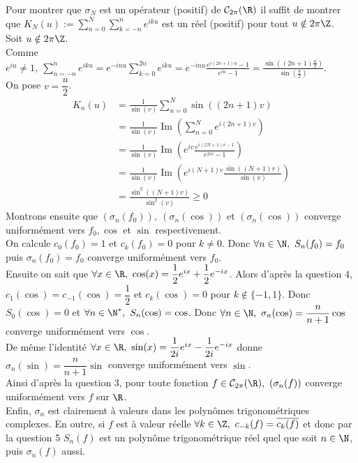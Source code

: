 \documentclass{book}
\begin{document}
\begin{enumerate}[leftmargin=*]
		Pour montrer que $\sigma_N$ est un opérateur (positif) de $\mathcal C_{2\pi}(\R)$ il suffit de montrer que $K_N(u):=\displaystyle\sum_{n=0}^N\sum_{k=-n}^ne^{iku}$ est un réel (positif) pour tout $u\notin 2\pi\Z$.\\
		Soit $u\notin 2\pi\Z$.\\
		Comme $e^{iu}\ne 1,\ \displaystyle\sum_{n=-n}^ne^{iku}=e^{-inu}\sum_{k=0}^{2n}e^{iku}=e^{-inu}\frac{e^{i(2n+1)u}-1}{e^{iu}-1}=\frac{\sin\left((2n+1)\frac{u}{2}\right)}{\sin\left(\frac{u}{2}\right)}$.\\
		On pose $v=\dfrac{u}{2}$.\\
		\begin{align*}
			K_n(u)&=\frac{1}{\sin(v)}\sum_{n=0}^N\sin((2n+1)v)\\
			&=\frac{1}{\sin(v)}\operatorname{Im}\left(\sum_{n=0}^Ne^{i(2n+1)v}\right)\\
			&=\frac{1}{\sin(v)}\operatorname{Im}\left(e^{iv}\frac{e^{i(2N+1)v-1}}{e^{2iv}-1}\right)\\
			&=\frac{1}{\sin(v)}\operatorname{Im}\left(e^{i(N+1)v}\frac{\sin((N+1)v)}{\sin(v)}\right)\\
			&=\frac{\sin^2((N+1)v)}{\sin^2(v)}\geq 0
		\end{align*}
		Montrons ensuite que $(\sigma_n(f_0)),\ (\sigma_n(\cos))$ et $(\sigma_n(\cos))$ converge uniformément vers $f_0,\cos$ et $\sin$ respectivement.\\
		On calcule $c_0(f_0)=1$ et $c_k(f_0)=0$ pour $k\ne 0$. Donc $\forall n\in \N,\ S_n(f_0)=f_0$ puis $\sigma_n(f_0)=f_0$ converge uniformément vers $f_0$.\\
		Ensuite on sait que $\forall x\in \R,\ \cos(x)=\dfrac{1}{2}e^{ix}+\dfrac{1}{2}e^{-ix}$. Alors d'après la question $4$, $c_1(\cos)=c_{-1}(\cos)=\dfrac{1}{2}$ et $c_k(\cos)=0$ pour $k\notin\{-1,1\}$. Donc $S_0(\cos)=0$ et $\forall n\in \N^*,\ S_n(\cos)=\cos$. Donc $\forall n\in \N,\ \sigma_n(\cos)=\dfrac{n}{n+1}\cos$ converge uniformément vers $\cos$.\\
		De même l'identité $\forall x\in \R,\ \sin(x)=\dfrac{1}{2i}e^{ix}-\dfrac{1}{2i}e^{-ix}$ donne $\sigma_n(\sin)=\dfrac{n}{n+1}\sin$ converge uniformément vers $\sin$.\\
		Ainsi d'après la question 3, pour toute fonction $f\in \mathcal C_{2\pi}(\R),\ (\sigma_n(f))$ converge uniformément vers $f$ sur $\R$.\\
		Enfin, $\sigma_n$ est clairement à valeurs dans les polynômes trigonométriques complexes. En outre, si $f$ est à valeur réelle $\forall k\in \Z,\ c_{-k}(f)=\overline{c_k(f)}$ et donc par la question 5 $S_n(f)$ est un polynôme trigonométrique réel quel que soit $n\in \N$, puis $\sigma_n(f)$ aussi.\\

\end{enumerate}
\end{document}

